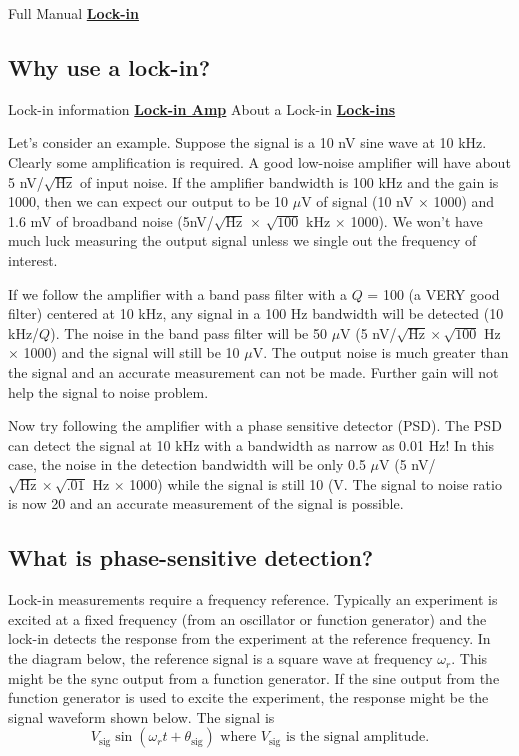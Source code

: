 \documentclass{../lab}
\begin{document}
Full Manual \href{http://physics111.lib.berkeley.edu/Physics111/Equipment\_Manuals/SRS/SR830m.pdf}{\textbf{Lock-in}}

\subsection{Why use a lock-in?}

Lock-in information \href{http://physics111.lib.berkeley.edu/Physics111/Reprints/NMR/Lock-in-Amp.pdf}{\textbf{Lock-in Amp}} About a Lock-in \href{http://physics111.lib.berkeley.edu/Physics111/Reprints/NMR/About-Lock-Ins.pdf}{\textbf{Lock-ins}}

Let's consider an example. Suppose the signal is a 10 nV sine wave at 10 kHz. Clearly some amplification is required. A good low-noise amplifier will have about 5 nV/$\sqrt{\text{Hz}}$ of input noise. If the amplifier bandwidth is 100 kHz and the gain is 1000, then we can expect our output to be 10 $\mu$V of signal (10 nV $\times$ 1000) and 1.6 mV of broadband noise (5nV/$\sqrt{\text{Hz}}$ $\times$ $\sqrt{100}$ kHz $\times$ 1000). We won't have much luck measuring the output signal unless we single out the frequency of interest.

If we follow the amplifier with a band pass filter with a $Q$ = 100 (a VERY good filter) centered at 10 kHz, any signal in a 100 Hz bandwidth will be detected (10 kHz/$Q$). The noise in the band pass filter will be 50 $\mu$V (5 nV/$\sqrt{\text{Hz}} \times \sqrt{100}$ Hz $\times$ 1000) and the signal will still be 10 $\mu$V. The output noise is much greater than the signal and an accurate measurement can not be made. Further gain will not help the signal to noise problem.

Now try following the amplifier with a phase sensitive detector (PSD). The PSD can detect the signal at 10 kHz with a bandwidth as narrow as 0.01 Hz! In this case, the noise in the detection bandwidth will be only 0.5 $\mu$V (5 nV/$\sqrt{\text{Hz}} \times \sqrt{.01}$ Hz $\times$ 1000) while the signal is still 10 (V. The signal to noise ratio is now 20 and an accurate measurement of the signal is possible.

\subsection{What is phase-sensitive detection?}

Lock-in measurements require a frequency reference. Typically an experiment is excited at a fixed frequency (from an oscillator or function generator) and the lock-in detects the response from the experiment at the reference frequency. In the diagram below, the reference signal is a square wave at frequency $\omega_r$. This might be the sync output from a function generator. If the sine output from the function generator is used to excite the experiment, the response might be the signal waveform shown below. The signal is
\[
    V_\text{sig}\sin(\omega_rt + \theta_\text{sig}) \text{ where } V_\text{sig} \text{ is the signal amplitude.}
\]
\end{document}
